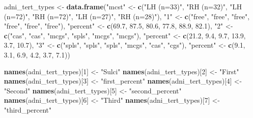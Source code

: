 \documentclass[
]{article}
\newenvironment{Shaded}{\begin{snugshade}}{\end{snugshade}}
\newcommand{\DecValTok}[1]{\textcolor[rgb]{0.00,0.00,0.81}{#1}}
\newcommand{\FloatTok}[1]{\textcolor[rgb]{0.00,0.00,0.81}{#1}}
\newcommand{\KeywordTok}[1]{\textcolor[rgb]{0.13,0.29,0.53}{\textbf{#1}}}
\newcommand{\NormalTok}[1]{#1}
\newcommand{\StringTok}[1]{\textcolor[rgb]{0.31,0.60,0.02}{#1}}
\begin{document}
\begin{Shaded}
\begin{Highlighting}[]
\NormalTok{adni_tert_types <-}\StringTok{ }\KeywordTok{data.frame}\NormalTok{(}\StringTok{"mcst"}\NormalTok{ <-}\StringTok{ }\KeywordTok{c}\NormalTok{(}\StringTok{"LH (n=33)"}\NormalTok{, }\StringTok{"RH (n=32)"}\NormalTok{, }\StringTok{"LH (n=72)"}\NormalTok{, }\StringTok{"RH (n=72)"}\NormalTok{, }\StringTok{"LH (n=27)"}\NormalTok{, }\StringTok{"RH (n=28)"}\NormalTok{),}
                              \StringTok{"1"}\NormalTok{ <-}\StringTok{ }\KeywordTok{c}\NormalTok{(}\StringTok{"free"}\NormalTok{, }\StringTok{"free"}\NormalTok{, }\StringTok{"free"}\NormalTok{, }\StringTok{"free"}\NormalTok{, }\StringTok{"free"}\NormalTok{, }\StringTok{"free"}\NormalTok{),}
                              \StringTok{"percent"}\NormalTok{ <-}\StringTok{ }\KeywordTok{c}\NormalTok{(}\FloatTok{69.7}\NormalTok{, }\FloatTok{87.5}\NormalTok{, }\FloatTok{80.6}\NormalTok{, }\FloatTok{77.8}\NormalTok{, }\FloatTok{88.9}\NormalTok{, }\FloatTok{82.1}\NormalTok{),}
                              \StringTok{"2"}\NormalTok{ <-}\StringTok{ }\KeywordTok{c}\NormalTok{(}\StringTok{"cas"}\NormalTok{, }\StringTok{"cas"}\NormalTok{, }\StringTok{"mcgs"}\NormalTok{, }\StringTok{"spls"}\NormalTok{, }\StringTok{"mcgs"}\NormalTok{, }\StringTok{"mcgs"}\NormalTok{),}
                              \StringTok{"percent"}\NormalTok{ <-}\StringTok{ }\KeywordTok{c}\NormalTok{(}\FloatTok{21.2}\NormalTok{, }\FloatTok{9.4}\NormalTok{, }\FloatTok{9.7}\NormalTok{, }\FloatTok{13.9}\NormalTok{, }\FloatTok{3.7}\NormalTok{, }\FloatTok{10.7}\NormalTok{),}
                              \StringTok{"3"}\NormalTok{ <-}\StringTok{ }\KeywordTok{c}\NormalTok{(}\StringTok{"spls"}\NormalTok{, }\StringTok{"spls"}\NormalTok{, }\StringTok{"spls"}\NormalTok{, }\StringTok{"mcgs"}\NormalTok{, }\StringTok{"cas"}\NormalTok{, }\StringTok{"cgs"}\NormalTok{),}
                              \StringTok{"percent"}\NormalTok{ <-}\StringTok{ }\KeywordTok{c}\NormalTok{(}\FloatTok{9.1}\NormalTok{, }\FloatTok{3.1}\NormalTok{, }\FloatTok{6.9}\NormalTok{, }\FloatTok{4.2}\NormalTok{, }\FloatTok{3.7}\NormalTok{, }\FloatTok{7.1}\NormalTok{))}

\KeywordTok{names}\NormalTok{(adni_tert_types)[}\DecValTok{1}\NormalTok{] <-}\StringTok{ "Sulci"}
\KeywordTok{names}\NormalTok{(adni_tert_types)[}\DecValTok{2}\NormalTok{] <-}\StringTok{ "First"}
\KeywordTok{names}\NormalTok{(adni_tert_types)[}\DecValTok{3}\NormalTok{] <-}\StringTok{ "first_percent"}
\KeywordTok{names}\NormalTok{(adni_tert_types)[}\DecValTok{4}\NormalTok{] <-}\StringTok{ "Second"}
\KeywordTok{names}\NormalTok{(adni_tert_types)[}\DecValTok{5}\NormalTok{] <-}\StringTok{ "second_percent"}
\KeywordTok{names}\NormalTok{(adni_tert_types)[}\DecValTok{6}\NormalTok{] <-}\StringTok{ "Third"}
\KeywordTok{names}\NormalTok{(adni_tert_types)[}\DecValTok{7}\NormalTok{] <-}\StringTok{ "third_percent"}


\end{Highlighting}
\end{Shaded}
\end{document}
